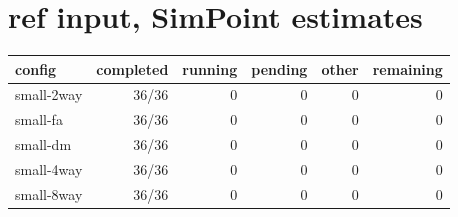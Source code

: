 \documentclass[10pt,a4paper,landscape]{article}
\begin{document}
\section*{ref input, SimPoint estimates}
{\small
\begin{longtable}{lrrrrr}
\toprule
config & completed & running & pending & other & remaining \\
\midrule
\endhead
\bottomrule
\endfoot
small-2way & 36/36 & 0 & 0 & 0 & 0 \\
small-fa & 36/36 & 0 & 0 & 0 & 0 \\
small-dm & 36/36 & 0 & 0 & 0 & 0 \\
small-4way & 36/36 & 0 & 0 & 0 & 0 \\
small-8way & 36/36 & 0 & 0 & 0 & 0 \\
\end{longtable}
}
\end{document}
